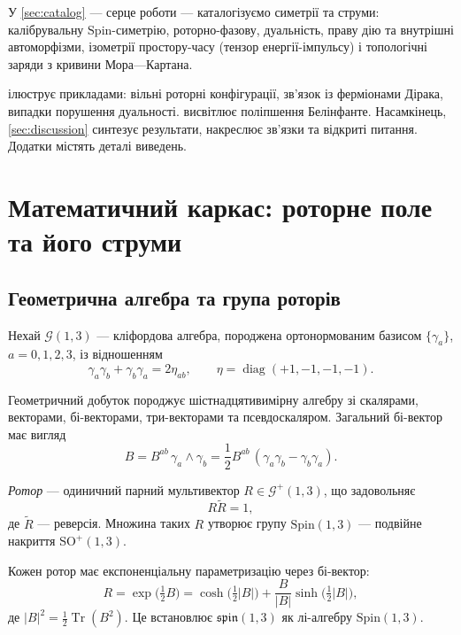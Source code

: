 \documentclass[11pt,a4paper]{article}
\numberwithin{equation}{section}
\theoremstyle{plain}
\theoremstyle{definition}
\theoremstyle{remark}
\DeclareMathOperator{\Tr}{Tr}
\DeclareMathOperator{\diag}{diag}
\begin{document}
У \cref{sec:catalog} — серце роботи — каталогізуємо симетрії та струми: калібрувальну $\mathrm{Spin}$-симетрію, роторно-фазову, дуальність, праву дію та внутрішні автоморфізми, ізометрії простору-часу (тензор енергії-імпульсу) і топологічні заряди з кривини Мора—Картана.

 ілюструє прикладами: вільні роторні конфігурації, зв’язок із ферміонами Дірака, випадки порушення дуальності.  висвітлює поліпшення Белінфанте. Насамкінець, \cref{sec:discussion} синтезує результати, накреслює зв’язки та відкриті питання. Додатки містять деталі виведень.

\section{Математичний каркас: роторне поле та його струми}
\label{sec:setup}

\subsection{Геометрична алгебра та група роторів}

Нехай $\mathcal{G}(1,3)$ — кліфордова алгебра, породжена ортонормованим базисом $\{\gamma_a\}$, $a=0,1,2,3$, із відношенням
\begin{equation}
\gamma_a\gamma_b+\gamma_b\gamma_a=2\eta_{ab}, \qquad \eta=\diag(+1,-1,-1,-1).
\end{equation}

Геометричний добуток породжує шістнадцятивимірну алгебру зі скалярами, векторами, бі-векторами, три-векторами та псевдоскаляром. Загальний бі-вектор має вигляд
\begin{equation}
B = B^{ab}\,\gamma_a\wedge\gamma_b = \frac{1}{2}B^{ab}\,(\gamma_a\gamma_b - \gamma_b\gamma_a).
\end{equation}

\emph{Ротор} — одиничний парний мультивектор $R \in \mathcal{G}^+(1,3)$, що задовольняє
\begin{equation}
R\widetilde{R} = 1,
\end{equation}
де $\widetilde{R}$ — реверсія. Множина таких $R$ утворює групу $\mathrm{Spin}(1,3)$ — подвійне накриття $\mathrm{SO}^+(1,3)$.

Кожен ротор має експоненціальну параметризацію через бі-вектор:
\begin{equation}
R = \exp\!\big(\tfrac{1}{2}B\big) = \cosh\!\big(\tfrac{1}{2}|B|\big) + \frac{B}{|B|}\sinh\!\big(\tfrac{1}{2}|B|\big),
\end{equation}
де $|B|^2 = \frac{1}{2}\Tr(B^2)$. Це встановлює $\mathfrak{spin}(1,3)$ як лі-алгебру $\mathrm{Spin}(1,3)$.
\end{document}

